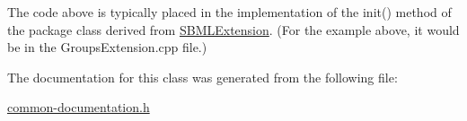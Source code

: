 The code above is typically placed in the implementation of the {\ttfamily init()} method of the package class derived from \hyperlink{class_s_b_m_l_extension}{S\+B\+M\+L\+Extension}. (For the example above, it would be in the {\ttfamily Groups\+Extension.\+cpp} file.) 

The documentation for this class was generated from the following file\+:\begin{DoxyCompactItemize}
\item 
\hyperlink{common-documentation_8h}{common-\/documentation.\+h}\end{DoxyCompactItemize}
